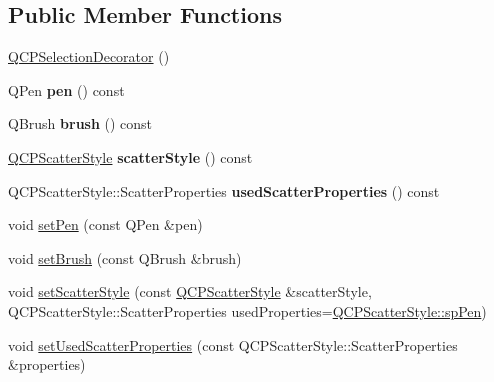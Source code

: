 \subsection*{Public Member Functions}
\begin{DoxyCompactItemize}
\item 
\mbox{\hyperlink{class_q_c_p_selection_decorator_aa145480d9a062cd176fe30900bb7bca8}{Q\+C\+P\+Selection\+Decorator}} ()
\item 
\mbox{\label{class_q_c_p_selection_decorator_a9307a60c9759223367909aed2d05ad91}} 
Q\+Pen {\bfseries pen} () const
\item 
\mbox{\label{class_q_c_p_selection_decorator_a783b643aa52120a25308fc501b9998b1}} 
Q\+Brush {\bfseries brush} () const
\item 
\mbox{\label{class_q_c_p_selection_decorator_aa6558f6f270a188bb633386aba0d1ae4}} 
\mbox{\hyperlink{class_q_c_p_scatter_style}{Q\+C\+P\+Scatter\+Style}} {\bfseries scatter\+Style} () const
\item 
\mbox{\label{class_q_c_p_selection_decorator_ab2019bf31dde39f1ec028e3810dfc08b}} 
Q\+C\+P\+Scatter\+Style\+::\+Scatter\+Properties {\bfseries used\+Scatter\+Properties} () const
\item 
void \mbox{\hyperlink{class_q_c_p_selection_decorator_ac2c8192e1e294aa3a4a7f32a859e3d76}{set\+Pen}} (const Q\+Pen \&pen)
\item 
void \mbox{\hyperlink{class_q_c_p_selection_decorator_aa74b626be518ea17055f918d423c8c2d}{set\+Brush}} (const Q\+Brush \&brush)
\item 
void \mbox{\hyperlink{class_q_c_p_selection_decorator_ab403a613289714ff4fd4a0c0371ab116}{set\+Scatter\+Style}} (const \mbox{\hyperlink{class_q_c_p_scatter_style}{Q\+C\+P\+Scatter\+Style}} \&scatter\+Style, Q\+C\+P\+Scatter\+Style\+::\+Scatter\+Properties used\+Properties=\mbox{\hyperlink{class_q_c_p_scatter_style_a8974f6a20f8f6eea7781f0e6af9deb46aa04d012e7c03e455db2b68fdd55c2a04}{Q\+C\+P\+Scatter\+Style\+::sp\+Pen}})
\item 
void \mbox{\hyperlink{class_q_c_p_selection_decorator_a808c1607cd4e83869c04986e332455c0}{set\+Used\+Scatter\+Properties}} (const Q\+C\+P\+Scatter\+Style\+::\+Scatter\+Properties \&properties)
\item 

\end{DoxyCompactItemize}
